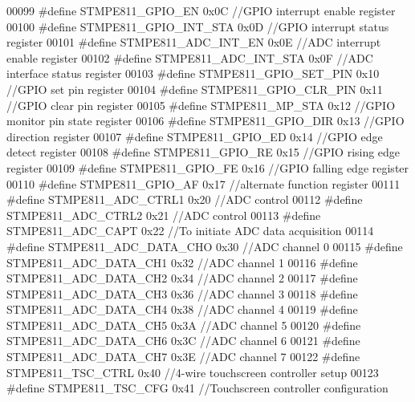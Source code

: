 \begin{DoxyCode}
00099 \textcolor{preprocessor}{#define STMPE811\_GPIO\_EN                0x0C    //GPIO interrupt enable register}
00100 \textcolor{preprocessor}{#define STMPE811\_GPIO\_INT\_STA           0x0D    //GPIO interrupt status register}
00101 \textcolor{preprocessor}{#define STMPE811\_ADC\_INT\_EN             0x0E    //ADC interrupt enable register}
00102 \textcolor{preprocessor}{#define STMPE811\_ADC\_INT\_STA            0x0F    //ADC interface status register}
00103 \textcolor{preprocessor}{#define STMPE811\_GPIO\_SET\_PIN           0x10    //GPIO set pin register}
00104 \textcolor{preprocessor}{#define STMPE811\_GPIO\_CLR\_PIN           0x11    //GPIO clear pin register}
00105 \textcolor{preprocessor}{#define STMPE811\_MP\_STA                 0x12    //GPIO monitor pin state register}
00106 \textcolor{preprocessor}{#define STMPE811\_GPIO\_DIR               0x13    //GPIO direction register}
00107 \textcolor{preprocessor}{#define STMPE811\_GPIO\_ED                0x14    //GPIO edge detect register}
00108 \textcolor{preprocessor}{#define STMPE811\_GPIO\_RE                0x15    //GPIO rising edge register}
00109 \textcolor{preprocessor}{#define STMPE811\_GPIO\_FE                0x16    //GPIO falling edge register}
00110 \textcolor{preprocessor}{#define STMPE811\_GPIO\_AF                0x17    //alternate function register}
00111 \textcolor{preprocessor}{#define STMPE811\_ADC\_CTRL1              0x20    //ADC control}
00112 \textcolor{preprocessor}{#define STMPE811\_ADC\_CTRL2              0x21    //ADC control}
00113 \textcolor{preprocessor}{#define STMPE811\_ADC\_CAPT               0x22    //To initiate ADC data acquisition}
00114 \textcolor{preprocessor}{#define STMPE811\_ADC\_DATA\_CHO           0x30    //ADC channel 0}
00115 \textcolor{preprocessor}{#define STMPE811\_ADC\_DATA\_CH1           0x32    //ADC channel 1}
00116 \textcolor{preprocessor}{#define STMPE811\_ADC\_DATA\_CH2           0x34    //ADC channel 2}
00117 \textcolor{preprocessor}{#define STMPE811\_ADC\_DATA\_CH3           0x36    //ADC channel 3}
00118 \textcolor{preprocessor}{#define STMPE811\_ADC\_DATA\_CH4           0x38    //ADC channel 4}
00119 \textcolor{preprocessor}{#define STMPE811\_ADC\_DATA\_CH5           0x3A    //ADC channel 5}
00120 \textcolor{preprocessor}{#define STMPE811\_ADC\_DATA\_CH6           0x3C    //ADC channel 6}
00121 \textcolor{preprocessor}{#define STMPE811\_ADC\_DATA\_CH7           0x3E    //ADC channel 7}
00122 \textcolor{preprocessor}{#define STMPE811\_TSC\_CTRL               0x40    //4-wire touchscreen controller setup}
00123 \textcolor{preprocessor}{#define STMPE811\_TSC\_CFG                0x41    //Touchscreen controller configuration}

\end{DoxyCode}
